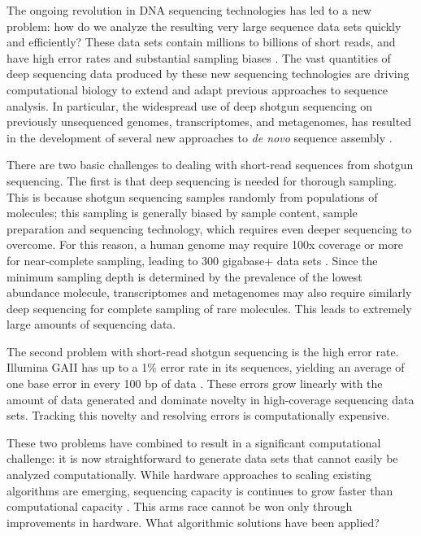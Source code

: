 \documentclass[10pt]{article}
\begin{document}
The ongoing revolution in DNA sequencing technologies has led to a new
problem: how do we analyze the resulting very large sequence data sets
quickly and efficiently? These data sets contain millions to billions
of short reads, and have high error rates and substantial sampling
biases \cite{pubmed19997069}.  The vast quantities of deep sequencing data produced by
these new sequencing technologies are driving
computational biology to extend and adapt previous approaches to sequence
analysis.  In
particular, the widespread use of deep shotgun sequencing on
previously unsequenced genomes, transcriptomes, and metagenomes, has
resulted in the development of several new approaches to {\em de novo}
sequence assembly \cite{pubmed20211242}.

There are two basic challenges to dealing with short-read sequences
from shotgun sequencing. The first is that deep sequencing is needed
for thorough sampling. This is because shotgun sequencing samples
randomly from populations of molecules; this sampling is
generally biased by sample content,
sample preparation and sequencing technology, which requires even deeper
sequencing to overcome.  For this reason, a
human genome may require 100x coverage or more for near-complete
sampling, leading to 300 gigabase+ data sets \cite{pubmed21187386}.  Since the minimum sampling depth
is determined by the prevalence of the lowest abundance molecule, transcriptomes and
metagenomes may also require similarly deep sequencing for complete
sampling of rare molecules. This leads to extremely large amounts of
sequencing data.

The second problem with short-read shotgun sequencing is the high
error rate.  Illumina GAII has up to a 1\% error rate in its
sequences, yielding an average of one base error in every 100 bp of
data \cite{pubmed19997069}.  These errors grow linearly with the amount of data generated and
dominate novelty in high-coverage sequencing data sets.  Tracking this
novelty and resolving errors is computationally expensive.

These two problems have combined to result in a significant
computational challenge: it is now straightforward to generate data
sets that cannot easily be analyzed computationally.  While hardware approaches
to scaling existing algorithms are emerging, sequencing capacity
is continues to grow faster than computational capacity \cite{pubmed20441614}.
This arms race cannot be won only through improvements
in hardware.  What algorithmic solutions have been applied?
\end{document}
